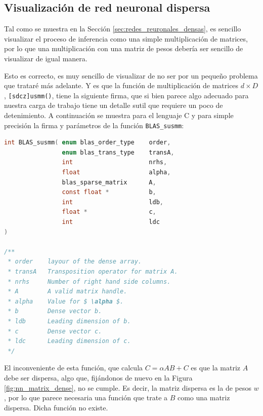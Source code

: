 \subsection{Visualización de red neuronal dispersa}
\label{ssec:visualizacion_nn_dispersa}
Tal como se muestra en la Sección \ref{sec:redes_reuronales_densas}, es sencillo visualizar el proceso de inferencia como una simple multiplicación de matrices, por lo que una multiplicación con una matriz de pesos debería ser sencillo de visualizar de igual manera.

Esto es correcto, es muy sencillo de visualizar de no ser por un pequeño problema que trataré más adelante. Y es que la función de multiplicación de matrices $d\times D$, \texttt{[sdcz]usmm()}, tiene la siguiente firma, que si bien parece algo adecuado para nuestra carga de trabajo tiene un detalle sutil que requiere un poco de detenimiento. A continuación se muestra para el lenguaje C y para simple precisión la firma y parámetros de la función \texttt{BLAS\_susmm}:

\begin{lstlisting}[language=C]
int BLAS_susmm( enum blas_order_type    order,
                enum blas_trans_type    transA,
                int                     nrhs,
                float                   alpha,
                blas_sparse_matrix      A,
                const float *           b,
                int                     ldb,
                float *                 c,
                int                     ldc 
)

/**
 * order    layour of the dense array.
 * transA   Transposition operator for matrix A.
 * nrhs     Number of right hand side columns.
 * A        A valid matrix handle.
 * alpha    Value for $ \alpha $.
 * b        Dense vector b.
 * ldb      Leading dimension of b.
 * c        Dense vector c.
 * ldc      Leading dimension of c.
 */
\end{lstlisting}

El inconveniente de esta función, que calcula $C = \alpha AB + C$ es que la matriz $A$ debe ser dispersa, algo que, fijándonos de nuevo en la Figura \ref{fig:nn_matrix_dense}, no se cumple. Es decir, la matriz dispersa es la de pesos $w$, por lo que parece necesaria una función que trate a $B$ como una matriz dispersa. Dicha función no existe.

